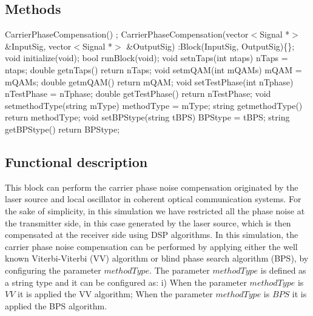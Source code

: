 \subsection*{Methods}

CarrierPhaseCompensation() {};
\bigbreak
CarrierPhaseCompensation(vector$<$Signal *$>$ \&InputSig, vector$<$Signal *$>$ \&OutputSig) :Block(InputSig, OutputSig)\{\};
\bigbreak
void initialize(void);
\bigbreak
bool runBlock(void);
\bigbreak
void setnTaps(int ntaps) { nTaps = ntaps; }
\bigbreak
double getnTaps() { return nTaps; }
\bigbreak
void setmQAM(int mQAMs) { mQAM = mQAMs; }
\bigbreak
double getmQAM() { return mQAM; }
\bigbreak
void setTestPhase(int nTphase) { nTestPhase = nTphase; }
\bigbreak
double getTestPhase() { return nTestPhase; }
\bigbreak
void setmethodType(string mType) { methodType = mType; }
\bigbreak
string getmethodType() { return methodType; }
\bigbreak
void setBPStype(string tBPS) { BPStype = tBPS; }
\bigbreak
string getBPStype() { return BPStype; }

\subsection*{Functional description}

This block can perform the carrier phase noise compensation originated by the laser source and local oscillator in coherent optical communication systems. For the sake of simplicity, in this simulation we have restricted all the phase noise at the transmitter side, in this case generated by the laser source, which is then compensated at the receiver side using DSP algorithms.
In this simulation, the carrier phase noise compensation can be performed by applying either the well known Viterbi-Viterbi (VV) algorithm or blind phase search algorithm (BPS), by configuring the parameter $methodType$. The parameter $methodType$ is defined as a string type and it can be configured as: i) When the parameter $methodType$ is $\textit{VV}$ it is applied the VV algorithm; When the parameter $methodType$ is $\textit{BPS}$ it is applied the BPS algorithm.

